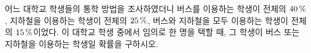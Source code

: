 어느 대학교 학생들의 통학 방법을 조사하였더니 버스를 이용하는 학생이 전체의 $40\mkern3mu \%$, 지하철을 이용하는 학생이 전체의 $25\mkern3mu \%$, 버스와 지하철을 모두 이용하는 학생이 전체의 $15\mkern3mu \%$이었다. 이 대학교 학생 중에서 임의로 한 명을 택할 때, 그 학생이 버스 또는 지하철을 이용하는 학생일 확률을 구하시오.
